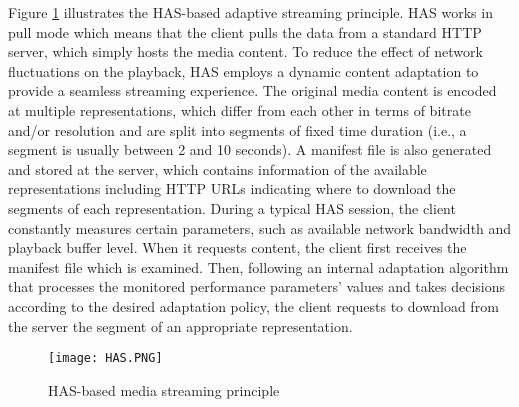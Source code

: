 Figure \ref{fig:IEEECOMSThas} illustrates the HAS-based adaptive streaming principle. HAS works in pull mode which means that the client pulls the data from a standard HTTP server, which simply hosts the media content. To reduce the effect of network fluctuations on the playback, HAS employs a dynamic content adaptation to provide a seamless streaming experience. The original media content is encoded at multiple representations, which differ from each other in terms of bitrate and/or resolution and are split into segments of fixed time duration (i.e., a segment is usually between 2 and 10 seconds). A manifest file is also generated and stored at the server, which contains information of the available representations including HTTP URLs indicating where to download the segments of each representation. During a typical HAS session, the client constantly measures certain parameters, such as available network bandwidth and playback buffer level. When it requests content, the client first receives the manifest file which is examined. Then, following an internal adaptation algorithm that processes the monitored performance parameters' values and takes decisions according to the  desired adaptation policy, the client requests to download from the server the segment of an appropriate representation.

\begin{figure}[htp]
	\centering
	\texttt{[image: HAS.PNG]}
	\caption{HAS-based media streaming principle}
	\label{fig:IEEECOMSThas}
	\vspace{-0.5cm}
\end{figure}

